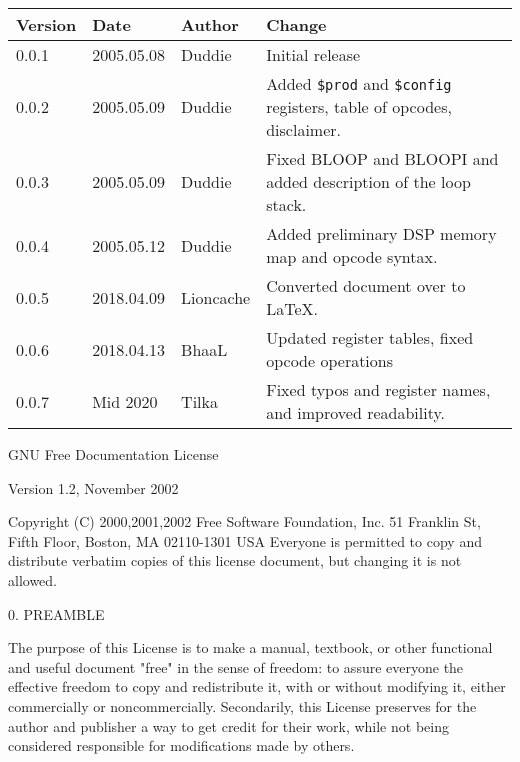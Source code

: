 \documentclass[oneside,english,a4paper,10pt,oneside,openany,final]{memoir}
\newcommand{\Register}[1]{\texttt{#1}}
\begin{document}
\begin{table}[htb]
\centering
\begin{tabular}{|l|l|l|l|}
\hline
\textbf{Version} & \textbf{Date} & \textbf{Author} & \textbf{Change}                                                                          \\ \hline
0.0.1            & 2005.05.08    & Duddie          & Initial release                                                                          \\ \hline
0.0.2            & 2005.05.09    & Duddie          & Added \Register{\$prod} and \Register{\$config} registers, table of opcodes, disclaimer. \\ \hline
0.0.3            & 2005.05.09    & Duddie          & Fixed BLOOP and BLOOPI and added description of the loop stack.                          \\ \hline
0.0.4            & 2005.05.12    & Duddie          & Added preliminary DSP memory map and opcode syntax.                                      \\ \hline
0.0.5            & 2018.04.09    & Lioncache       & Converted document over to LaTeX.                                                        \\ \hline
0.0.6            & 2018.04.13    & BhaaL           & Updated register tables, fixed opcode operations                                         \\ \hline
0.0.7            & Mid 2020      & Tilka           & Fixed typos and register names, and improved readability.                                \\ \hline
\end{tabular}
\end{table}

\pagebreak{}


GNU Free Documentation License

Version 1.2, November 2002

  Copyright (C) 2000,2001,2002  Free Software Foundation, Inc.
  51 Franklin St, Fifth Floor, Boston, MA  02110-1301  USA
  Everyone is permitted to copy and distribute verbatim copies
  of this license document, but changing it is not allowed.

0. PREAMBLE

The purpose of this License is to make a manual, textbook, or other functional and useful document "free" in the sense of freedom: to assure everyone the effective freedom to copy and redistribute it, with or without modifying it, either commercially or noncommercially. Secondarily, this License preserves for the author and publisher a way to get credit for their work, while not being considered responsible for modifications made by others.
\end{document}
